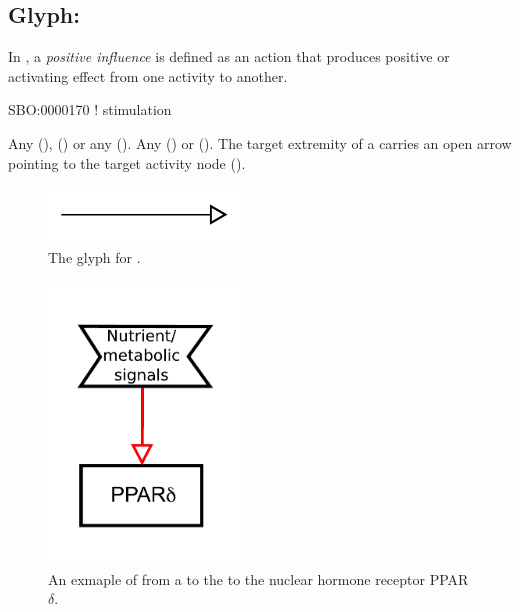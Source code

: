 \subsection{Glyph: }
\label{sec:af:positive_infl}

In \SBGNAFLone, a \emph{positive influence} is defined as an action that produces positive or activating effect from one activity to another.

\begin{glyphDescription}

\glyphSboTerm SBO:0000170 ! stimulation

 \glyphOrigin Any  (),   () or any  ().
 \glyphTarget Any  () or  ().
 \glyphEndPoint The target extremity of a  carries an open arrow pointing to the target activity node ().

\end{glyphDescription}

\begin{figure}[H]
  \centering
  \includegraphics[width = 2in]{images/positiveInfluence}
  \caption{The \AF glyph for .}
  \label{fig:af:positiveInfl}
\end{figure}

\begin{figure}[H]
  \centering
  \includegraphics[width = 2in]{examples/ex-positiveInfluence}
  \caption{An exmaple of  from a  to the to the nuclear hormone receptor PPAR$\delta$.}
  \label{fig:af:exPI}
\end{figure} 